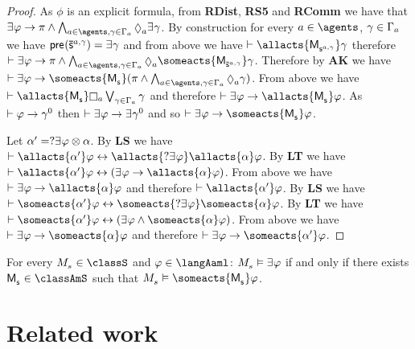 \begin{proof}
    As $\phi$ is an explicit formula, from {\bf RDist}, {\bf RS5} and {\bf RComm} we have that $\somerefs \phi \implies \pi \land \bigwedge_{\agentA \in \agents, \gamma \in \Gamma_\agentA} \possible[\agentA] \somerefs \gamma$.
    By construction for every $\agentA \in \agents$, $\gamma \in \Gamma_a$ we have $\aPrecondition(\aPStateS[\agentA,\gamma]) = \somerefs \gamma$ and from above we have $\proves \allacts{\aPModel{\aStateS[\agentA,\gamma]}} \gamma$ therefore $\proves \somerefs \phi \implies \pi \land \bigwedge_{\agentA \in \agents, \gamma \in \Gamma_\agentA} \possible[\agentA] \someacts{\aPModel{\aPStateS[\agentA,\gamma]}} \gamma$.
    Therefore by {\bf AK} we have $\proves \somerefs \phi \implies \someacts{\aPModel{\aStateS}} (\pi \land \bigwedge_{\agentA \in \agents, \gamma \in \Gamma_\agentA} \possible[\agentA] \gamma)$.
    From above we have $\proves \allacts{\aPModel{\aStateS}} \necessary[\agentA] \bigvee_{\gamma \in \Gamma_\agentA} \gamma$ and therefore $\proves \somerefs \phi \implies \allacts{\aPModel{\aStateS}} \phi$.
    As $\vdash \varphi \rightarrow \gamma^0$ then $\proves \somerefs \phi \implies \somerefs \gamma^0$ and so $\proves \somerefs \phi \implies \someacts{\aPModel{\aStateS}} \phi$.

    Let $\alpha' = \test{\somerefs \phi} \compose \alpha$.
    By {\bf LS} we have $\proves \allacts{\alpha'} \phi \iff \allacts{\test{\somerefs \phi}} \allacts{\alpha} \phi$.
    By {\bf LT} we have $\proves \allacts{\alpha'} \phi \iff (\somerefs \phi \implies \allacts{\alpha} \phi)$.
    From above we have $\proves \somerefs \phi \implies \allacts{\alpha} \phi$ and therefore $\proves \allacts{\alpha'} \phi$.
    By {\bf LS} we have $\proves \someacts{\alpha'} \phi \iff \someacts{\test{\somerefs \phi}} \someacts{\alpha} \phi$.
    By {\bf LT} we have $\proves \someacts{\alpha'} \phi \iff (\somerefs \phi \land \someacts{\alpha} \phi)$.
    From above we have $\proves \somerefs \phi \implies \someacts{\alpha} \phi$ and therefore $\proves \somerefs \phi \implies \someacts{\alpha'} \phi$.
\end{proof}

\begin{corollary}
    For every $\kPModel{\kStateS} \in \classS$ and $\phi \in \langAaml$: $\kPModel{\kStateS} \entails \somerefs \phi$ if and only if there exists $\aPModel{\aStateS} \in \classAmS$ such that $\kPModel{\kStateS} \entails \someacts{\aPModel{\aStateS}} \phi$.
\end{corollary}

\section{Related work}\label{related-work}

